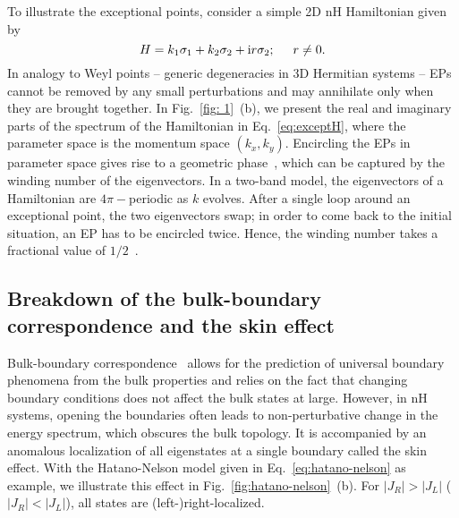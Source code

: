 To illustrate the exceptional points, consider a simple 2D nH Hamiltonian given by
\begin{equation}
H = k_1 \sigma_1 + k_2 \sigma_2 + \mathrm{i} r \sigma_2; \hspace*{0.5cm} r \neq 0.
\label{eq:exceptH}
\end{equation}
In analogy to Weyl points -- generic degeneracies in 3D Hermitian systems -- EPs cannot be removed by any small perturbations and may annihilate only when they are brought together. In Fig.~\ref{fig: 1}~(b), we present the real and imaginary parts of the spectrum of the Hamiltonian in Eq.~\eqref{eq:exceptH}, where the parameter space is the momentum space $(k_x, k_y)$. Encircling the EPs in parameter space gives rise to a geometric phase~\cite{PhysRevA.72.014104, PhysRevE.69.056216}, which can be captured by the winding number of the eigenvectors. In a two-band model, the eigenvectors of a Hamiltonian are $4 \pi-$periodic as $k$ evolves. After a single loop around an exceptional point, the two eigenvectors swap; in order to come back to the initial situation, an EP has to be encircled twice. Hence, the winding number takes a fractional value of $1/2$~\cite{lee19prl133903}.

\subsection{Breakdown of the bulk-boundary correspondence and the skin effect}
Bulk-boundary correspondence~\cite{prodan2016bulk} allows for the prediction of universal boundary phenomena from the bulk properties and relies on the fact that changing boundary conditions does not affect the bulk states at large. However, in nH systems, opening the boundaries often leads to non-perturbative change in the energy spectrum, which obscures the bulk topology. It is accompanied by an anomalous localization of all eigenstates at a single boundary called the skin effect. With the Hatano-Nelson model given in Eq.~\eqref{eq:hatano-nelson} as example, we illustrate this effect in Fig.~\ref{fig:hatano-nelson}~(b). For $|J_R| > |J_L|$ ($|J_R| < |J_L|$), all states are (left-)right-localized.

